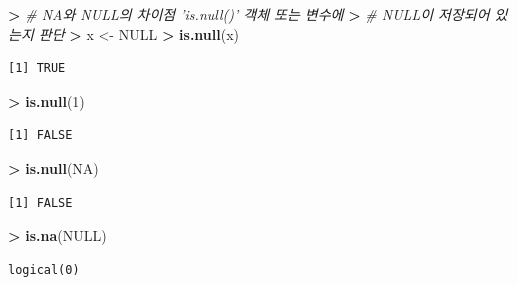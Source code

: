 \documentclass[12pt,a4paper]{book}
\newenvironment{Shaded}{\begin{snugshade}}{\end{snugshade}}
\newcommand{\KeywordTok}[1]{\textcolor[rgb]{0.13,0.29,0.53}{\textbf{#1}}}
\newcommand{\DecValTok}[1]{\textcolor[rgb]{0.00,0.00,0.81}{#1}}
\newcommand{\StringTok}[1]{\textcolor[rgb]{0.31,0.60,0.02}{#1}}
\newcommand{\CommentTok}[1]{\textcolor[rgb]{0.56,0.35,0.01}{\textit{#1}}}
\newcommand{\OtherTok}[1]{\textcolor[rgb]{0.56,0.35,0.01}{#1}}
\newcommand{\OperatorTok}[1]{\textcolor[rgb]{0.81,0.36,0.00}{\textbf{#1}}}
\newcommand{\ErrorTok}[1]{\textcolor[rgb]{0.64,0.00,0.00}{\textbf{#1}}}
\newcommand{\NormalTok}[1]{#1}
\theoremstyle{definition}
\theoremstyle{definition}
\theoremstyle{definition}
\theoremstyle{remark}
\begin{document}
\begin{Shaded}
\begin{Highlighting}[]
\OperatorTok{>}\StringTok{ }\CommentTok{# NA와 NULL의 차이점 'is.null()' 객체 또는 변수에}
\ErrorTok{>}\StringTok{ }\CommentTok{# NULL이 저장되어 있는지 판단}
\ErrorTok{>}\StringTok{ }\NormalTok{x <-}\StringTok{ }\OtherTok{NULL}
\OperatorTok{>}\StringTok{ }\KeywordTok{is.null}\NormalTok{(x)}
\end{Highlighting}
\end{Shaded}

\begin{verbatim}
[1] TRUE
\end{verbatim}

\begin{Shaded}
\begin{Highlighting}[]
\OperatorTok{>}\StringTok{ }\KeywordTok{is.null}\NormalTok{(}\DecValTok{1}\NormalTok{)}
\end{Highlighting}
\end{Shaded}

\begin{verbatim}
[1] FALSE
\end{verbatim}

\begin{Shaded}
\begin{Highlighting}[]
\OperatorTok{>}\StringTok{ }\KeywordTok{is.null}\NormalTok{(}\OtherTok{NA}\NormalTok{)}
\end{Highlighting}
\end{Shaded}

\begin{verbatim}
[1] FALSE
\end{verbatim}

\begin{Shaded}
\begin{Highlighting}[]
\OperatorTok{>}\StringTok{ }\KeywordTok{is.na}\NormalTok{(}\OtherTok{NULL}\NormalTok{)}
\end{Highlighting}
\end{Shaded}

\begin{verbatim}
logical(0)
\end{verbatim}
\end{document}
